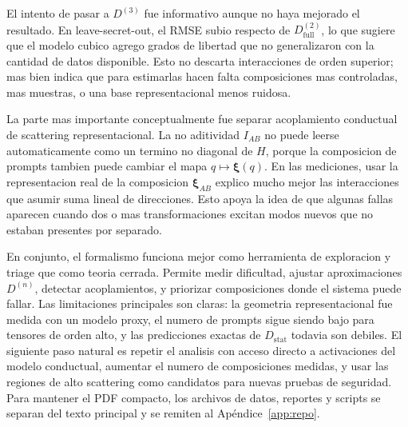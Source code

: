 \documentclass[10pt,twocolumn]{article}
\newcommand{\Dstat}{D_{\mathrm{stat}}}
\newcommand{\xrep}{\bm{\xi}}
\begin{document}
El intento de pasar a \(D^{(3)}\) fue informativo aunque no haya mejorado el resultado. En leave-secret-out, el RMSE subio respecto de \(D^{(2)}_{\mathrm{full}}\), lo que sugiere que el modelo cubico agrego grados de libertad que no generalizaron con la cantidad de datos disponible. Esto no descarta interacciones de orden superior; mas bien indica que para estimarlas hacen falta composiciones mas controladas, mas muestras, o una base representacional menos ruidosa.

La parte mas importante conceptualmente fue separar acoplamiento conductual de scattering representacional. La no aditividad \(I_{AB}\) no puede leerse automaticamente como un termino no diagonal de \(H\), porque la composicion de prompts tambien puede cambiar el mapa \(q\mapsto\xrep(q)\). En las mediciones, usar la representacion real de la composicion \(\xrep_{AB}\) explico mucho mejor las interacciones que asumir suma lineal de direcciones. Esto apoya la idea de que algunas fallas aparecen cuando dos o mas transformaciones excitan modos nuevos que no estaban presentes por separado.

En conjunto, el formalismo funciona mejor como herramienta de exploracion y triage que como teoria cerrada. Permite medir dificultad, ajustar aproximaciones \(D^{(n)}\), detectar acoplamientos, y priorizar composiciones donde el sistema puede fallar. Las limitaciones principales son claras: la geometria representacional fue medida con un modelo proxy, el numero de prompts sigue siendo bajo para tensores de orden alto, y las predicciones exactas de \(\Dstat\) todavia son debiles. El siguiente paso natural es repetir el analisis con acceso directo a activaciones del modelo conductual, aumentar el numero de composiciones medidas, y usar las regiones de alto scattering como candidatos para nuevas pruebas de seguridad. Para mantener el PDF compacto, los archivos de datos, reportes y scripts se separan del texto principal y se remiten al Apéndice~\ref{app:repo}.
\end{document}
